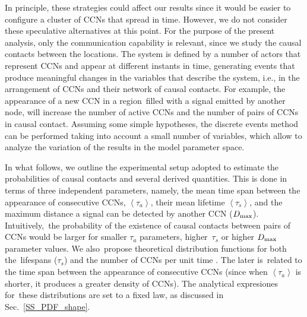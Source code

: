 \documentclass[crop]{CSLB}
\newcommand{\ceti}{CCN}
\newcommand{\cetis}{CCNs}
\begin{document}
%
In principle, these strategies could affect our results since it would be easier to configure a cluster of \cetis{} that spread in time.
%
However, we do not consider these speculative alternatives at this point.
%
For the purpose of the present analysis, only the communication capability is relevant, since we study the causal contacts between the locations.
%
The system is defined by a number of actors that represent \cetis{} and appear at different instants in time, generating events that produce meaningful changes in the variables that describe the system, i.e., in the arrangement of \cetis{} and their network of causal contacts.
%
For example, the appearance of a new \ceti{} in a region filled with a signal emitted by another node, will increase the number of active \cetis{} and the number of pairs of \cetis{} in causal contact.
%
Assuming some simple hypotheses, the discrete events method can be performed taking into account a small number of variables, which allow to analyze the variation of the results in the model parameter space.



In what follows, we outline the experimental setup adopted to estimate the probabilities of causal contacts and several derived quantities.
%
This is done in terms of three independent parameters, namely, the
mean time span between the appearance of consecutive \cetis{},
$\left<\tau_a\right>$, their mean lifetime $\left<\tau_s\right>$, and
the maximum distance a signal can be detected by another \ceti{}
($D_{\rm max}$).
%
Intuitively, the probability of the existence of causal contacts
between pairs of \cetis{} would be larger for smaller $\tau_a$
parameters, higher $\tau_s$ or higher $D_{\rm max}$ parameter values.
%
We also propose theoretical distribution functions for both the lifespans ($\tau_s$) and the number of \cetis{} per unit time \citep{maccone_evolution_2014, Sotos_biotechnology_2019}.
%
The later is related to the time span between the appearance of consecutive \cetis{} (since when $\left<\tau_a\right>$ is shorter, it produces a greater density of \cetis{}).
%
The analytical expresiones for these distributions are set to a fixed law, as discussed in Sec.~\ref{SS_PDF_shape}.  
    
\end{document}
